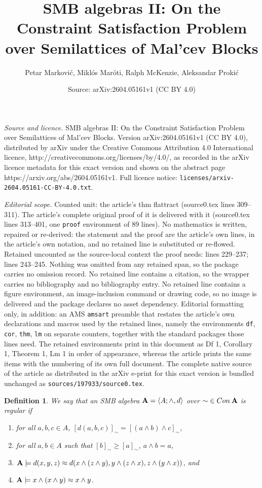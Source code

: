 \documentclass[10pt,a4paper]{amsart}
\title{SMB algebras II: On the Constraint Satisfaction Problem over Semilattices of Mal'cev Blocks}
\author{Petar Markovi\'c, Mikl\'os Mar\'oti, Ralph McKenzie, Aleksandar Proki\'c}
\date{Source: arXiv:2604.05161v1 (CC BY 4.0)}
\newtheorem{df}{Definition}
\newcommand{\cn}[1]{{\con\m {#1}}}
\newcommand{\con}{{\rm Con\:}}
\newcommand{\lb}{\langle}
\newcommand{\m}[1]{{\uppercase {\mathbf {#1}}}}
\newcommand{\mt}{\wedge}
\newcommand{\rb}{\rangle}
\begin{document}
\maketitle

\noindent\emph{Source and licence.} SMB algebras II: On the Constraint Satisfaction Problem over Semilattices of Mal'cev Blocks. Version arXiv:2604.05161v1 (CC BY 4.0), distributed by arXiv under the Creative Commons Attribution 4.0 International licence, http://creativecommons.org/licenses/by/4.0/, as recorded in the arXiv licence metadata for this exact version and shown on the abstract page https://arxiv.org/abs/2604.05161v1. Full licence notice: \texttt{licenses/arxiv-2604.05161-CC-BY-4.0.txt}.\par\smallskip

\noindent\textit{Editorial scope.} Counted unit: the article's thm flattract (source0.tex lines 309--311). The article's complete original proof of it is delivered with it (source0.tex lines 313--401, one \texttt{proof} environment of 89 lines). No mathematics is written, repaired or re-derived: the statement and the proof are the article's own lines, in the article's own notation, and no retained line is substituted or re-flowed.  Retained uncounted as the source-local context the proof needs: lines 229--237; lines 243--245.  Nothing was omitted from any retained span, so the package carries no omission record.  No retained line contains a citation, so the wrapper carries no bibliography and no bibliography entry.  No retained line contains a figure environment, an image-inclusion command or drawing code, so no image is delivered and the package declares no asset dependency.  Editorial formatting only, in addition: an AMS \texttt{amsart} preamble that restates the article's own declarations and macros used by the retained lines, namely the environments \texttt{df}, \texttt{cor}, \texttt{thm}, \texttt{lm} on separate counters, together with the standard packages those lines need.  The retained environments print in this document as Df 1, Corollary 1, Theorem 1, Lm 1 in order of appearance, whereas the article prints the same items with the numbering of its own full document.  The complete native source of the article as distributed in the arXiv e-print for this exact version is bundled unchanged as \texttt{sources/197933/source0.tex}.
\begin{df}\label{regSMBdef}
We say that an SMB algebra $\m a=\lb A;\mt,d\rb$ over ${\sim}\in\cn a$ is {\em regular} if 
\begin{enumerate}
\item\label{property1} for all $a,b,c\in A$, $[d(a,b,c)]_{\sim}=[(a\mt b)\mt c]_{\sim}$,
\item for all $a,b\in A$ such that $[b]_{\sim}\geq[a]_{\sim}$, $a\mt b=a$,
\item $\m a\models d(x,y,z)\approx d(x\mt (z\mt y),y\mt (z\mt x),z\mt (y\mt x))$, and
\item $\m a\models x\mt (x\mt y)\approx x\mt y$.
\end{enumerate}
\end{df}
\end{document}

